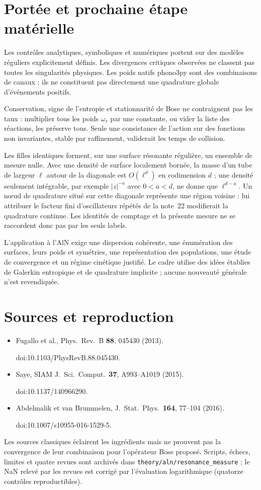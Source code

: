 \documentclass[11pt,a4paper]{article}
\begin{document}
\section{Portée et prochaine étape matérielle}
Les contrôles analytiques, symboliques et numériques portent sur
des modèles réguliers explicitement définis. Les divergences critiques
observées ne classent pas toutes les singularités physiques.
Les poids natifs phono3py sont des combinaisons de canaux ; ils ne
constituent pas directement une quadrature globale d'événements positifs.

Conservation, signe de l'entropie et stationnarité de Bose ne
contraignent pas les taux : multiplier tous les poids $\omega_r$ par une
constante, ou vider la liste des réactions, les préserve tous. Seule une
consistance de l'action sur des fonctions non invariantes, stable par
raffinement, validerait les temps de collision.

Les filles identiques forment, sur une surface résonante régulière,
un ensemble de mesure nulle. Avec une densité de surface localement
bornée, la masse d'un tube de largeur $\ell$ autour de la diagonale est
$O(\ell^d)$ en codimension $d$ ; une densité seulement intégrable, par
exemple $|z|^{-a}$ avec $0<a<d$, ne donne que $\ell^{d-a}$. Un nœud de
quadrature situé sur cette diagonale représente une région voisine :
lui attribuer le facteur fini d'oscillateurs répétés de la note~22
modifierait la quadrature continue. Les identités de comptage et la
présente mesure ne se raccordent donc pas par les seuls labels.

L'application à l'AlN exige une dispersion cohérente, une énumération
des surfaces, leurs poids et symétries, une représentation des populations,
une étude de convergence et un régime cinétique justifié.
Le cadre utilise des idées établies de Galerkin entropique et de
quadrature implicite ; aucune nouveauté générale n'est revendiquée.

\section{Sources et reproduction}
\begin{itemize}
\item Fugallo et al., Phys.\ Rev.\ B \textbf{88}, 045430 (2013).
\par doi:10.1103/PhysRevB.88.045430.
\item Saye, SIAM J.\ Sci.\ Comput.\ \textbf{37}, A993--A1019 (2015).
\par doi:10.1137/140966290.
\item Abdelmalik et van Brummelen, J.\ Stat.\ Phys.\ \textbf{164},
77--104 (2016).
\par doi:10.1007/s10955-016-1529-5.
\end{itemize}
Les sources classiques éclairent les ingrédients mais ne prouvent
pas la convergence de leur combinaison pour l'opérateur Bose proposé.
Scripts, échecs, limites et quatre revues sont archivés dans
\texttt{theory/\allowbreak aln/\allowbreak resonance\_measure} ; le NaN
relevé par les revues est corrigé par l'évaluation logarithmique
(quatorze contrôles reproductibles).
\end{document}
